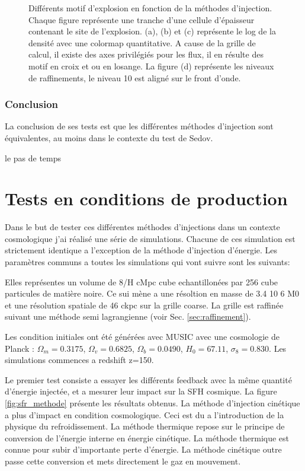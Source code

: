 \begin{figure}[htpb]
    \caption{Différents motif d'explosion en fonction de la méthodes d'injection.
    Chaque figure représente une tranche d'une cellule d'épaisseur contenant le site de l'explosion.
    (a), (b) et (c) représente le log de la densité avec une colormap quantitative.
    A cause de la grille de calcul, il existe des axes privilégiés pour les flux, il en résulte des motif en croix et ou en losange.
    La figure (d) représente les niveaux de raffinements, le niveau 10 est aligné sur le front d'onde.
    }
 	\label{fig:sedovslice}
\end{figure}



\subsubsection{Conclusion}

La conclusion de ses tests est que les différentes méthodes d'injection sont équivalentes, au moins dans le contexte du test de Sedov.


le pas de temps\\


\section{Tests en conditions de production}

Dans le but de tester ces différentes méthodes d'injections dans un contexte cosmologique j'ai réalisé une série de simulations.
Chacune de ces simulation est strictement identique a l'exception de la méthode d'injection d'énergie.
Les paramètres communs a toutes les simulations qui vont suivre sont les suivants:

Elles représentes un volume de 8/H cMpc cube echantillonées par 256 cube particules de matière noire.
Ce sui mène a une résoltion en masse de 3.4 10 6 M0 et une résolution spatiale de 46 ckpc sur la grille coarse.
La grille est raffinée suivant une méthode semi lagrangienne (voir Sec. \ref{sec:raffinement}).

Les condition initiales ont été générées avec MUSIC avec une cosmologie de Planck \citep{planck_collaboration_planck_2016} : 
$\Omega_m=0.3175$, 
$\Omega_v=0.6825$,
$\Omega_b=0.0490$,
$H_0=67.11$,
$\sigma_8=0.830$. 
Les simulations commences a redshift z=150.


Le premier test consiste a essayer les différents feedback avec la même quantité d'énergie injectée, et a mesurer leur impact sur la SFH cosmique.
La figure \ref{fig:sfr_methode} présente les résultats obtenus.
La méthode d'injection cinétique a plus d'impact en condition cosmologique.
Ceci est du a l'introduction de la physique du refroidissement.
La méthode thermique repose sur le principe de conversion de l'énergie interne en énergie cinétique.
La méthode thermique est connue %
pour subir d'importante perte d'énergie.
La méthode cinétique outre passe cette conversion et mets directement le gaz en mouvement.

